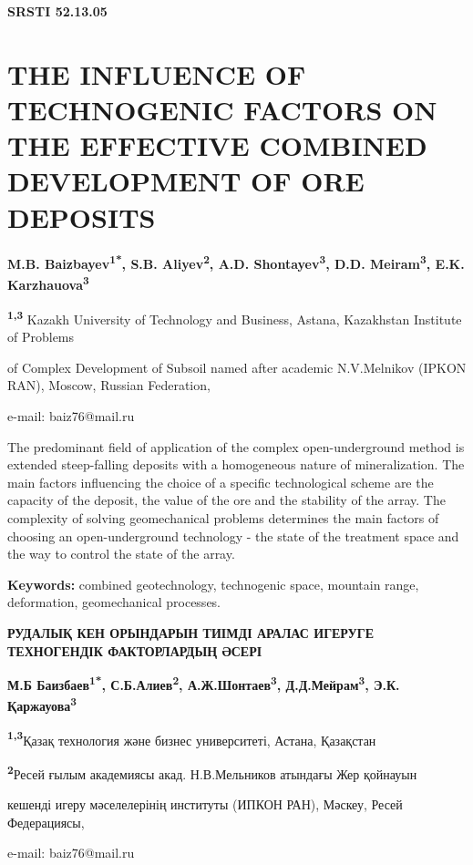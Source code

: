 \clearpage
{\bfseries SRSTI 52.13.05}

\section{THE INFLUENCE OF TECHNOGENIC FACTORS ON THE EFFECTIVE COMBINED DEVELOPMENT OF ORE DEPOSITS}

\begin{center}
{\bfseries M.B. Baizbayev\textsuperscript{1*}, S.B.
Aliyev\textsuperscript{2}, A.D. Shontayev\textsuperscript{3}, D.D.
Meiram\textsuperscript{3}, E.K. Karzhauova\textsuperscript{3}}

{\bfseries \textsuperscript{1,3}} Kazakh University of Technology and
Business, Astana, Kazakhstan Institute of Problems

of Complex Development of Subsoil named after academic N.V.Melnikov
(IPKON RAN), Moscow, Russian Federation,

e-mail: baiz76@mail.ru
\end{center}

The predominant field of application of the complex open-underground
method is extended steep-falling deposits with a homogeneous nature of
mineralization. The main factors influencing the choice of a specific
technological scheme are the capacity of the deposit, the value of the
ore and the stability of the array. The complexity of solving
geomechanical problems determines the main factors of choosing an
open-underground technology - the state of the treatment space and the
way to control the state of the array.

{\bfseries Keywords:} combined geotechnology, technogenic space, mountain
range, deformation, geomechanical processes.

\begin{center}
{\large\bfseries РУДАЛЫҚ КЕН ОРЫНДАРЫН ТИІМДІ АРАЛАС ИГЕРУГЕ ТЕХНОГЕНДІК ФАКТОРЛАРДЫҢ ӘСЕРІ}

{\bfseries М.Б Баизбаев\textsuperscript{1*}, С.Б.Алиев\textsuperscript{2},
А.Ж.Шонтаев\textsuperscript{3}, Д.Д.Мейрам\textsuperscript{3}, Э.К.
Қаржауова\textsuperscript{3}}

{\bfseries \textsuperscript{1,3}}Қазақ технология және бизнес университеті,
Астана, Қазақстан

{\bfseries \textsuperscript{2}}Ресей ғылым академиясы акад. Н.В.Мельников
атындағы Жер қойнауын

кешенді игеру мәселелерінің институты (ИПКОН РАН), Мәскеу, Ресей
Федерациясы,

e-mail: baiz76@mail.ru
\end{center}

